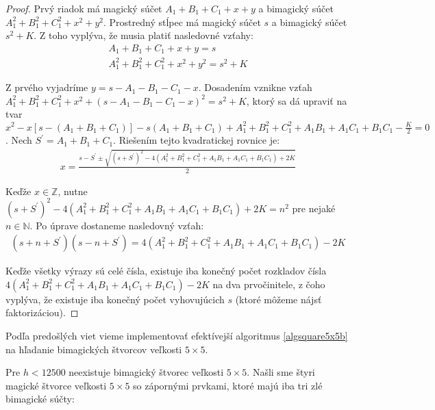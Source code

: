 \begin{proof} Prvý riadok má magický súčet $A_1 + B_1 + C_1 + x + y$ a bimagický súčet $A_1^2 + B_1^2 + C_1^2 + x^2 + y^2$. Prostredný stĺpec má magický súčet $s$ a bimagický súčet $s^2 + K$. Z toho vyplýva, že musia platiť nasledovné vzťahy:
\begin{gather*}
A_1 + B_1 + C_1 + x + y = s \\
A_1^2 + B_1^2 + C_1^2 + x^2 + y^2 = s^2 + K
\end{gather*}

Z prvého vyjadríme $y = s - A_1 - B_1 - C_1 - x$. Dosadením vznikne vzťah $A_1^2 + B_1^2 + C_1^2 + x^2 + (s - A_1 - B_1 - C_1 - x)^2 = s^2 + K$, ktorý sa dá upraviť na tvar $x^2 - x[s - (A_1 + B_1 + C_1)] - s(A_1 + B_1 + C_1) + A_1^2 + B_1^2 + C_1^2 + A_1 B_1 + A_1 C_1 + B_1 C_1 - \frac{K}{2} = 0$. Nech $S^\prime = A_1 + B_1 + C_1$. Riešením tejto kvadratickej rovnice je:
\begin{gather*}
x = \frac{s - S^\prime \pm \sqrt{(s + S^\prime)^2 - 4(A_1^2 + B_1^2 + C_1^2 + A_1 B_1 + A_1 C_1 + B_1 C_1) + 2K}}{2}
\end{gather*}

Keďže $x \in \mathbb{Z}$, nutne $(s + S^\prime)^2 - 4(A_1^2 + B_1^2 + C_1^2 + A_1 B_1 + A_1 C_1 + B_1 C_1) + 2K = n^2$ pre nejaké $n \in \mathbb{N}$. Po úprave dostaneme nasledovný vzťah:
\begin{gather*}
(s + n + S^\prime)(s - n + S^\prime) = 4(A_1^2 + B_1^2 + C_1^2 + A_1 B_1 + A_1 C_1 + B_1 C_1) - 2K
\end{gather*}

Keďže všetky výrazy sú celé čísla, existuje iba konečný počet rozkladov čísla $4(A_1^2 + B_1^2 + C_1^2 + A_1 B_1 + A_1 C_1 + B_1 C_1) - 2K$ na dva prvočinitele, z čoho vyplýva, že existuje iba konečný počet vyhovujúcich $s$ (ktoré môžeme nájsť faktorizáciou).
\end{proof}

Podľa predošlých viet vieme implementovať efektívejší algoritmus \ref{algsquare5x5b} na hľadanie bimagických štvorcov veľkosti $5 \times 5$. 

\begin{result} Pre $h < 12500$ neexistuje bimagický štvorec veľkosti $5 \times 5$. Našli sme štyri magické štvorce veľkosti $5 \times 5$ so zápornými prvkami, ktoré majú iba tri zlé bimagické súčty:
\end{result}


